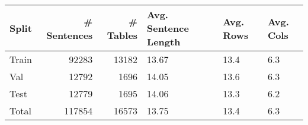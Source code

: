 \begin{tabular}{lrrlll}
\toprule
Split & # Sentences & # Tables & Avg. Sentence Length & Avg. Rows & Avg. Cols \\
\midrule
Train & 92283 & 13182 & 13.67 & 13.4 & 6.3 \\
Val & 12792 & 1696 & 14.05 & 13.6 & 6.3 \\
Test & 12779 & 1695 & 14.06 & 13.3 & 6.2 \\
Total & 117854 & 16573 & 13.75 & 13.4 & 6.3 \\
\bottomrule
\end{tabular}

